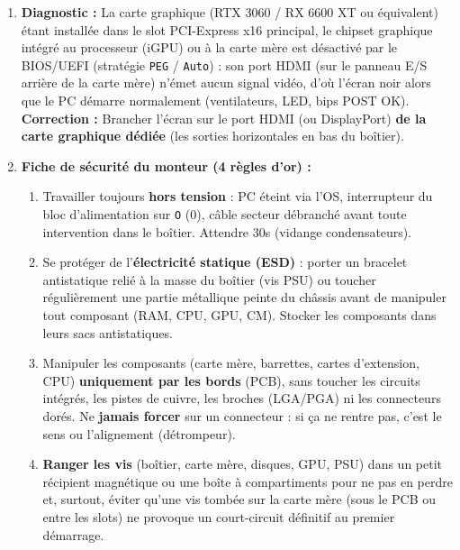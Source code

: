 \documentclass[11pt]{article}
\begin{document}
\begin{corrige}
\begin{enumerate}
\begin{itemize}
    \item Le graveur Blu-ray au port \texttt{SATA3} ;
    \item Chacun des trois périphériques reçoit en outre un \textbf{câble d'alimentation SATA} (connecteur plat à 15 broches, clé de polarisation) venant du bloc d'alimentation (câble modulaire ou natif).
  \end{itemize}
  Aucun réglage maître/esclave n'est nécessaire car le SATA est une liaison \emph{point à point} : chaque câble de données ne relie qu'un seul périphérique à un seul port contrôleur, il n'y a donc pas de partage de canal ni d'arbitrage comme sur une nappe IDE parallèle.
  \item \textbf{Diagnostic :} La carte graphique (RTX 3060 / RX 6600 XT ou équivalent) étant installée dans le slot PCI-Express x16 principal, le chipset graphique intégré au processeur (iGPU) ou à la carte mère est désactivé par le BIOS/UEFI (stratégie \texttt{PEG} / \texttt{Auto}) : son port HDMI (sur le panneau E/S arrière de la carte mère) n'émet aucun signal vidéo, d'où l'écran noir alors que le PC démarre normalement (ventilateurs, LED, bips POST OK). \textbf{Correction :} Brancher l'écran sur le port HDMI (ou DisplayPort) \textbf{de la carte graphique dédiée} (les sorties horizontales en bas du boîtier).
  \item \textbf{Fiche de sécurité du monteur (4 règles d'or) :}
  \begin{enumerate}
    \item Travailler toujours \textbf{hors tension} : PC éteint via l'OS, interrupteur du bloc d'alimentation sur \texttt{O} (0), câble secteur débranché avant toute intervention dans le boîtier. Attendre 30s (vidange condensateurs).
    \item Se protéger de l'\textbf{électricité statique (ESD)} : porter un bracelet antistatique relié à la masse du boîtier (vis PSU) ou toucher régulièrement une partie métallique peinte du châssis avant de manipuler tout composant (RAM, CPU, GPU, CM). Stocker les composants dans leurs sacs antistatiques.
    \item Manipuler les composants (carte mère, barrettes, cartes d'extension, CPU) \textbf{uniquement par les bords} (PCB), sans toucher les circuits intégrés, les pistes de cuivre, les broches (LGA/PGA) ni les connecteurs dorés. Ne \textbf{jamais forcer} sur un connecteur : si ça ne rentre pas, c'est le sens ou l'alignement (détrompeur).
    \item \textbf{Ranger les vis} (boîtier, carte mère, disques, GPU, PSU) dans un petit récipient magnétique ou une boîte à compartiments pour ne pas en perdre et, surtout, éviter qu'une vis tombée sur la carte mère (sous le PCB ou entre les slots) ne provoque un court-circuit définitif au premier démarrage.

\end{enumerate}
\end{enumerate}
\end{corrige}
\end{document}

